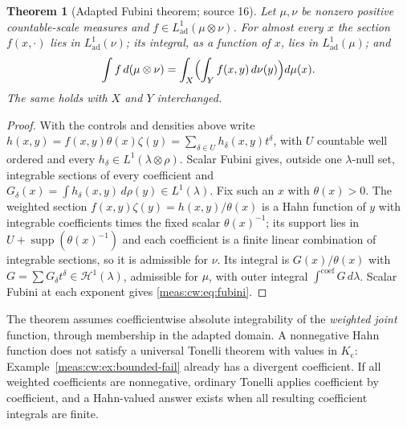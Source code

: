 \documentclass[11pt]{article}
\numberwithin{equation}{section}
\newtheorem{theorem}{Theorem}[section]
\theoremstyle{definition}
\theoremstyle{remark}
\newcommand{\supp}{\operatorname{supp}}
\newcommand{\Kc}{K_{\mathrm c}}
\newcommand{\intc}{\mathop{\int}\nolimits^{\mathrm{coef}}}
\newcommand{\Lad}{L^1_{\mathrm{ad}}}
\newcommand{\Hone}[1]{\mathscr H^1(#1)}
\begin{document}
\begin{theorem}[Adapted Fubini theorem; source 16]\label{meas:cw:thm:fubini}
Let $\mu,\nu$ be nonzero positive countable-scale measures and
$f\in\Lad(\mu\otimes\nu)$. For almost every $x$ the section $f(x,\cdot)$ lies in
$\Lad(\nu)$; its integral, as a function of $x$, lies in $\Lad(\mu)$; and
\begin{equation}\label{meas:cw:eq:fubini}
 \int f\,d(\mu\otimes\nu)=\int_X\Bigl(\int_Yf(x,y)\,d\nu(y)\Bigr)d\mu(x).
\end{equation}
The same holds with $X$ and $Y$ interchanged.
\end{theorem}
\begin{proof}
With the controls and densities above write
$h(x,y)=f(x,y)\theta(x)\zeta(y)=\sum_{\delta\in U}h_\delta(x,y)t^\delta$, with $U$ countable
well ordered and every $h_\delta\in L^1(\lambda\otimes\rho)$. Scalar Fubini gives,
outside one $\lambda$-null set, integrable sections of every coefficient and
$G_\delta(x)=\int h_\delta(x,y)\,d\rho(y)\in L^1(\lambda)$. Fix such an $x$ with
$\theta(x)>0$. The weighted section $f(x,y)\zeta(y)=h(x,y)/\theta(x)$ is a Hahn function
of $y$ with integrable coefficients times the fixed scalar $\theta(x)^{-1}$; its
support lies in $U+\supp(\theta(x)^{-1})$ and each coefficient is a finite linear
combination of integrable sections, so it is admissible for $\nu$. Its integral is
$G(x)/\theta(x)$ with $G=\sum G_\delta t^\delta\in\Hone{\lambda}$, admissible for $\mu$, with
outer integral $\intc G\,d\lambda$. Scalar Fubini at each exponent gives
\eqref{meas:cw:eq:fubini}.
\end{proof}

The theorem assumes coefficientwise absolute integrability of the \emph{weighted
joint} function, through membership in the adapted domain. A nonnegative Hahn
function does not satisfy a universal Tonelli theorem with values in $\Kc$:
Example~\ref{meas:cw:ex:bounded-fail} already has a divergent coefficient. If all
weighted coefficients are nonnegative, ordinary Tonelli applies coefficient by
coefficient, and a Hahn-valued answer exists when all resulting coefficient
integrals are finite.
\end{document}
